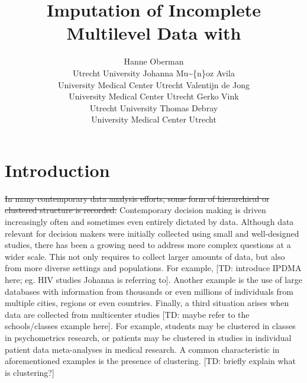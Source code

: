\documentclass[
]{jss}
\author{
Hanne Oberman\\Utrecht University \And Johanna Mu\textasciitilde\{n\}oz
Avila\\University Medical Center Utrecht \AND Valentijn de
Jong\\University Medical Center Utrecht \And Gerko Vink\\Utrecht
University \AND Thomas Debray\\University Medical Center Utrecht
}
\title{Imputation of Incomplete Multilevel Data with \pkg{mice}}
\begin{document}
\hypertarget{introduction}{%
\section{Introduction}\label{introduction}}

\sout{In many contemporary data analysis efforts, some form of
hierarchical or clustered structure is recorded.} Contemporary decision
making is driven increasingly often and sometimes even entirely dictated
by data. Although data relevant for decision makers were initially
collected using small and well-designed studies, there has been a
growing need to address more complex questions at a wider scale. This
not only requires to collect larger amounts of data, but also from more
diverse settings and populations. For example, {[}TD: introduce IPDMA
here; eg. HIV studies Johanna is referring to{]}. Another example is the
use of large databases with information from thousands or even millions
of individuals from multiple cities, regions or even countries. Finally,
a third situation arises when data are collected from multicenter
studies {[}TD: maybe refer to the schools/classes example here{]}. For
example, students may be clustered in classes in psychometrics research,
or patients may be clustered in studies in individual patient data
meta-analyses in medical research. A common characteristic in
aforementioned examples is the presence of clustering. {[}TD: briefly
explain what is clustering?{]}
\end{document}
